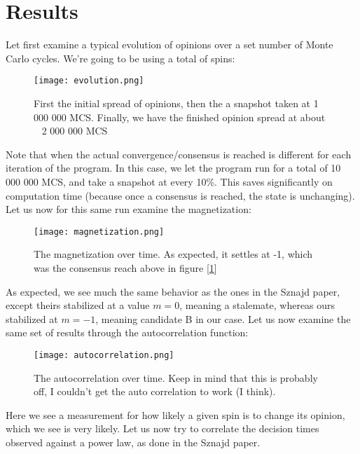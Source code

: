 \documentclass{article}
\begin{document}
\section{Results}
Let first examine a typical evolution of opinions over a set number of Monte Carlo cycles. We're going to be using a total of spins:
\begin{figure}[ht!]
    \centering
    \texttt{[image: evolution.png]}
    \caption{First the initial spread of opinions, then the a snapshot taken at 1 000 000 MCS. Finally, we have the finished opinion spread at about ~ 2 000 000 MCS }
    \label{fig2}
\end{figure} \newline
Note that when the actual convergence/consensus is reached is different for each iteration of the program. In this case, we let the program run for a total of 10 000 000 MCS, and take a snapshot at every 10\%. This saves significantly on computation time (because once a consensus is reached, the state is unchanging). \newline
Let us now for this same run examine the magnetization:
\begin{figure}[ht!]
    \centering
    \texttt{[image: magnetization.png]}
    \caption{The magnetization over time. \newline
    As expected, it settles at -1, which was the consensus reach above in figure [\ref{fig2}]}
    \label{fig3}
\end{figure} \newline
As expected, we see much the same behavior as the ones in the Sznajd paper, except theirs stabilized at a value $m = 0$, meaning a stalemate, whereas ours stabilized at $m = -1$, meaning candidate B in our case.
\newline
Let us now examine the same set of results through the autocorrelation function:
\begin{figure}[ht!]
    \centering
    \texttt{[image: autocorrelation.png]}
    \caption{The autocorrelation over time. \newline
    Keep in mind that this is probably off, I couldn't get the auto correlation to work (I think).}
    \label{fig4}
\end{figure} \newline
Here we see a measurement for how likely a given spin is to change its opinion, which we see is very likely. \newline
Let us now try to correlate the decision times observed against a power law, as done in the Sznajd paper.
\end{document}
